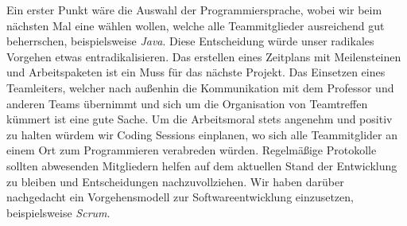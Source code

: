 Ein erster Punkt wäre die Auswahl der Programmiersprache, wobei wir beim nächsten Mal eine wählen wollen, welche alle Teammitglieder ausreichend gut beherrschen, beispielsweise \emph{Java}. Diese Entscheidung würde unser radikales Vorgehen etwas entradikalisieren. Das erstellen eines Zeitplans mit Meilensteinen und Arbeitspaketen ist ein Muss für das nächste Projekt.
Das Einsetzen eines Teamleiters, welcher nach außenhin die Kommunikation mit dem Professor und anderen Teams übernimmt und sich um die Organisation von Teamtreffen kümmert ist eine gute Sache. Um die Arbeitsmoral stets angenehm und positiv zu halten würdem wir Coding Sessions einplanen, wo sich alle Teammitglider an einem Ort zum Programmieren verabreden würden. Regelmäßige Protokolle sollten abwesenden Mitgliedern helfen auf dem aktuellen Stand der Entwicklung zu bleiben und Entscheidungen nachzuvollziehen.
Wir haben darüber nachgedacht ein Vorgehensmodell zur Softwareentwicklung einzusetzen, beispielsweise \emph{Scrum}.